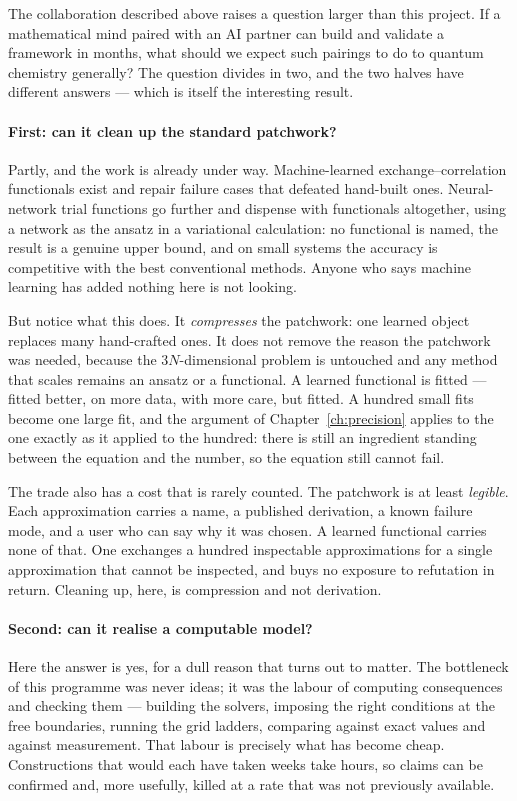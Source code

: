 The collaboration described above raises a question larger than this project. If a mathematical mind
paired with an AI partner can build and validate a framework in months, what should we expect such
pairings to do to quantum chemistry generally? The question divides in two, and the two halves have
different answers --- which is itself the interesting result.

\paragraph{First: can it clean up the standard patchwork?} Partly, and the work is already under
way. Machine-learned exchange--correlation functionals exist and repair failure cases that defeated
hand-built ones. Neural-network trial functions go further and dispense with functionals altogether,
using a network as the ansatz in a variational calculation: no functional is named, the result is a
genuine upper bound, and on small systems the accuracy is competitive with the best conventional
methods. Anyone who says machine learning has added nothing here is not looking.

But notice what this does. It \emph{compresses} the patchwork: one learned object replaces many
hand-crafted ones. It does not remove the reason the patchwork was needed, because the
$3N$-dimensional problem is untouched and any method that scales remains an ansatz or a functional.
A learned functional is fitted --- fitted better, on more data, with more care, but fitted. A
hundred small fits become one large fit, and the argument of Chapter~\ref{ch:precision} applies to
the one exactly as it applied to the hundred: there is still an ingredient standing between the
equation and the number, so the equation still cannot fail.

The trade also has a cost that is rarely counted. The patchwork is at least \emph{legible}. Each
approximation carries a name, a published derivation, a known failure mode, and a user who can say
why it was chosen. A learned functional carries none of that. One exchanges a hundred inspectable
approximations for a single approximation that cannot be inspected, and buys no exposure to
refutation in return. Cleaning up, here, is compression and not derivation.

\paragraph{Second: can it realise a computable model?} Here the answer is yes, for a dull reason
that turns out to matter. The bottleneck of this programme was never ideas; it was the labour of
computing consequences and checking them --- building the solvers, imposing the right conditions at
the free boundaries, running the grid ladders, comparing against exact values and against
measurement. That labour is precisely what has become cheap. Constructions that would each have
taken weeks take hours, so claims can be confirmed and, more usefully, killed at a rate that was not
previously available.

